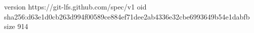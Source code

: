 version https://git-lfs.github.com/spec/v1
oid sha256:d63e1d0cb263d994f00589ce884ef71dee2ab4336e32cbe6993649b54e1dabfb
size 914
